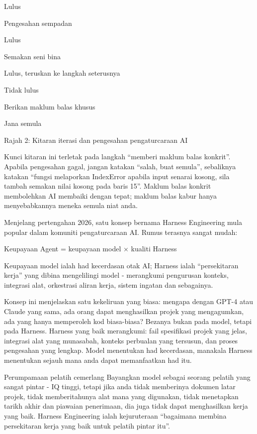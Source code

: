Lulus

Pengesahan sempadan

Lulus

Semakan seni bina

Lulus, teruskan ke langkah seterusnya

Tidak lulus

Berikan maklum balas khusus

Jana semula

\begin{center}\small\color{gray}Rajah 2: Kitaran iterasi dan pengesahan pengaturcaraan AI\end{center}

Kunci kitaran ini terletak pada langkah “memberi maklum balas konkrit”. Apabila pengesahan gagal, jangan katakan “salah, buat semula”, sebaliknya katakan “fungsi melaporkan IndexError apabila input senarai kosong, sila tambah semakan nilai kosong pada baris 15”. Maklum balas konkrit membolehkan AI membaiki dengan tepat; maklum balas kabur hanya menyebabkannya meneka semula niat anda.


Menjelang pertengahan 2026, satu konsep bernama Harness Engineering mula popular dalam komuniti pengaturcaraan AI. Rumus terasnya sangat mudah:

Keupayaan Agent = keupayaan model × kualiti Harness

Keupayaan model ialah had kecerdasan otak AI; Harness ialah “persekitaran kerja” yang dibina mengelilingi model - merangkumi pengurusan konteks, integrasi alat, orkestrasi aliran kerja, sistem ingatan dan sebagainya.

Konsep ini menjelaskan satu kekeliruan yang biasa: mengapa dengan GPT-4 atau Claude yang sama, ada orang dapat menghasilkan projek yang mengagumkan, ada yang hanya memperoleh kod biasa-biasa? Bezanya bukan pada model, tetapi pada Harness. Harness yang baik merangkumi: fail spesifikasi projek yang jelas, integrasi alat yang munasabah, konteks perbualan yang tersusun, dan proses pengesahan yang lengkap. Model menentukan had kecerdasan, manakala Harness menentukan sejauh mana anda dapat memanfaatkan had itu.

\begin{tcbinfo}{Perumpamaan pelatih cemerlang}
Bayangkan model sebagai seorang pelatih yang sangat pintar - IQ tinggi, tetapi jika anda tidak memberinya dokumen latar projek, tidak memberitahunya alat mana yang digunakan, tidak menetapkan tarikh akhir dan piawaian penerimaan, dia juga tidak dapat menghasilkan kerja yang baik. Harness Engineering ialah kejuruteraan “bagaimana membina persekitaran kerja yang baik untuk pelatih pintar itu”.

\end{tcbinfo}

